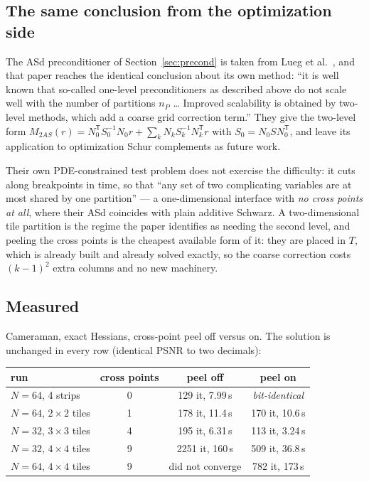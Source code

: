 \documentclass[11pt]{article}
\begin{document}
\subsection{The same conclusion from the optimization side}

The ASd preconditioner of Section~\ref{sec:precond} is taken from Lueg et
al.\ \cite{lueg2025}, and that paper reaches the identical conclusion about
its own method: ``it is well known that so-called one-level preconditioners as
described above do not scale well with the number of partitions $n_P$ \dots
Improved scalability is obtained by two-level methods, which add a coarse grid
correction term.''  They give the two-level form
$M_{2AS}(r) = N_0^{\mathsf T}S_0^{-1}N_0 r + \sum_k N_k S_k^{-1} N_k^{\mathsf T} r$
with $S_0 = N_0 S N_0^{\mathsf T}$, and leave its application to optimization
Schur complements as future work.

Their own PDE-constrained test problem does not exercise the difficulty: it
cuts along breakpoints in time, so that ``any set of two complicating
variables are at most shared by one partition'' --- a one-dimensional
interface with \emph{no cross points at all}, where their ASd coincides with
plain additive Schwarz.  A two-dimensional tile partition is the regime the
paper identifies as needing the second level, and peeling the cross points is
the cheapest available form of it: they are placed in $T$, which is already
built and already solved exactly, so the coarse correction costs
$(k-1)^2$ extra columns and no new machinery.

\subsection{Measured}

Cameraman, exact Hessians, cross-point peel off versus on.  The solution is
unchanged in every row (identical PSNR to two decimals):

\begin{center}
\begin{tabular}{lccc}
\toprule
run & cross points & peel off & peel on\\
\midrule
$N=64$, 4 strips        & 0 & 129 it, 7.99\,s & \emph{bit-identical}\\
$N=64$, $2\times2$ tiles & 1 & 178 it, 11.4\,s & 170 it, 10.6\,s\\
$N=32$, $3\times3$ tiles & 4 & 195 it, 6.31\,s & 113 it, 3.24\,s\\
$N=32$, $4\times4$ tiles & 9 & 2251 it, 160\,s & 509 it, 36.8\,s\\
$N=64$, $4\times4$ tiles & 9 & did not converge & 782 it, 173\,s\\
\bottomrule
\end{tabular}
\end{center}
\end{document}

